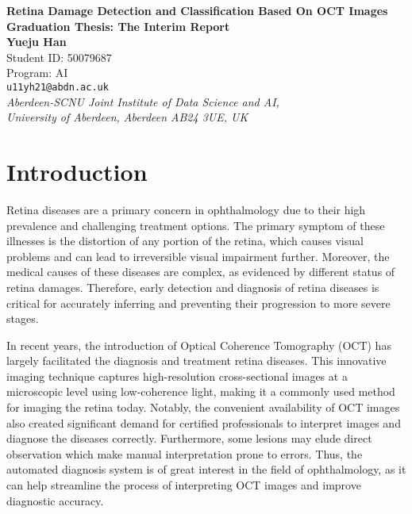 \documentclass[a4paper,12pt]{article}
\begin{document}
\begin{center}
{\Large\bf{Retina Damage Detection and Classification Based On OCT Images}} \\
      \vspace{5.0mm}
{\Large\bf{Graduation Thesis: The Interim Report}} \\
      \vspace{8mm}
      {\large\bf{Yueju Han}}  \\
      {\large{Student ID: 50079687}}  \\
      {\large{Program: AI}}  \\
      \vspace{5.0mm}
       {\tt u11yh21@abdn.ac.uk} \\
      \vspace{5.0mm}
      {\em Aberdeen-SCNU Joint Institute of Data Science and AI,\\
       University of Aberdeen, Aberdeen AB24 3UE, UK} 
\end{center}


\section*{Introduction}

Retina diseases are a primary concern in ophthalmology due to their high prevalence and challenging treatment options. The primary symptom of these illnesses is the distortion of any portion of the retina, which causes visual problems and can lead to irreversible visual impairment further. Moreover, the medical causes of these diseases are complex, as evidenced by different status of retina damages. Therefore, early detection and diagnosis of retina diseases is critical for accurately inferring and preventing their progression to more severe stages.

In recent years, the introduction of Optical Coherence Tomography (OCT) has largely facilitated the diagnosis and treatment retina diseases. This innovative imaging technique captures high-resolution cross-sectional images at a microscopic level using low-coherence light, making it a commonly used method for imaging the retina today. Notably, the convenient availability of OCT images also created significant demand for certified professionals to interpret images and diagnose the diseases correctly. Furthermore, some lesions may elude direct observation which make manual interpretation prone to errors. Thus, the automated diagnosis system is of great interest in the field of ophthalmology, as it can help streamline the process of interpreting OCT images and improve diagnostic accuracy.
\end{document}

